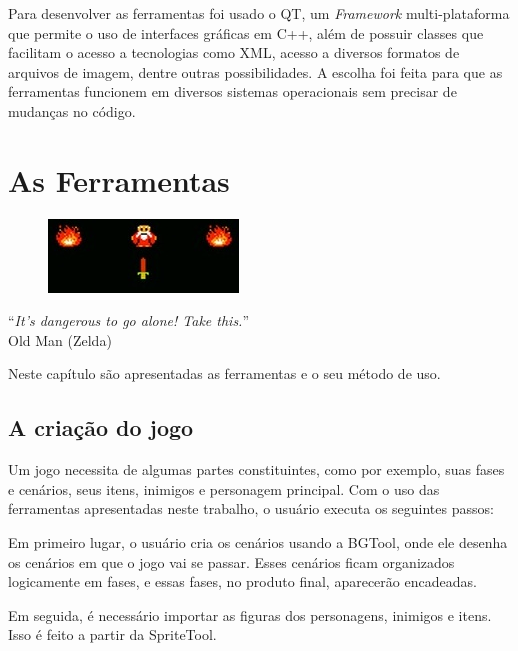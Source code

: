 \documentclass[brazil]{abnt}
\begin{document}
Para desenvolver as ferramentas foi usado o QT, um \textit{Framework} multi-plataforma que permite o uso de interfaces gráficas em C++, além de possuir classes que facilitam o acesso a tecnologias como XML, acesso a diversos formatos de arquivos de imagem, dentre outras possibilidades. A escolha foi feita para que as ferramentas funcionem em diversos sistemas operacionais sem precisar de mudanças no código.

\chapter{As Ferramentas\label{cap:ferramentas}}

\vfill{}
\begin{flushright}{}
\begin{figure}[h!]
\hfill\includegraphics{imgs/oldman.jpg}
\end{figure}
``\emph{It's dangerous to go alone! Take this.}''\\
{\small Old Man (Zelda)}\end{flushright}{\small \par}
\vfill{}

Neste capítulo são apresentadas as ferramentas e o seu método de uso.
\newpage

\section{A criação do jogo\label{sec:workflow}}

Um jogo necessita de algumas partes constituintes, como por exemplo, suas fases e cenários, seus itens, inimigos e personagem principal. Com o uso das ferramentas apresentadas neste trabalho, o usuário executa os seguintes passos:

Em primeiro lugar, o usuário cria os cenários usando a BGTool, onde ele desenha os cenários em que o jogo vai se passar. Esses cenários ficam organizados logicamente em fases, e essas fases, no produto final, aparecerão encadeadas.

Em seguida, é necessário importar as figuras dos personagens, inimigos e itens. Isso é feito a partir da SpriteTool. 
\end{document}
